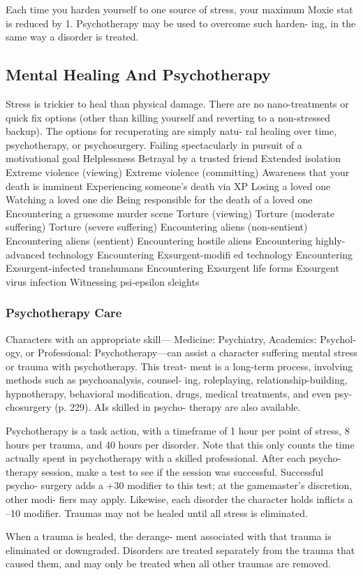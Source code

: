 Each time you harden yourself to one source of 
stress, your maximum Moxie stat is reduced by 1. 
Psychotherapy may be used to overcome such harden-
ing, in the same way a disorder is treated.

\subsection{Mental Healing And Psychotherapy}

Stress is trickier to heal than physical damage. There 
are no nano-treatments or quick fix options (other 
than killing yourself and reverting to a non-stressed 
backup). The options for recuperating are simply natu-
ral healing over time, psychotherapy, or psychosurgery.
Failing spectacularly in pursuit of a motivational goal
Helplessness
Betrayal by a trusted friend
Extended isolation
Extreme violence (viewing)
Extreme violence (committing)
Awareness that your death is imminent
Experiencing someone's death via XP
Losing a loved one
Watching a loved one die
Being responsible for the death of a loved one
Encountering a gruesome murder scene
Torture (viewing)
Torture (moderate suffering)
Torture (severe suffering)
Encountering aliens (non-sentient)
Encountering aliens (sentient)
Encountering hostile aliens
Encountering highly-advanced technology
Encountering Exsurgent-modiﬁ ed technology
Encountering Exsurgent-infected transhumans
Encountering Exsurgent life forms
Exsurgent virus infection
Witnessing psi-epsilon sleights

\subsubsection{Psychotherapy Care}

Characters with an appropriate skill—
Medicine: Psychiatry, Academics: Psychol-
ogy, or Professional: Psychotherapy—can 
assist a character suffering mental stress 
or trauma with psychotherapy. This treat-
ment is a long-term process, involving 
methods such as psychoanalysis, counsel-
ing, roleplaying, relationship-building, 
hypnotherapy, behavioral modification, 
drugs, medical treatments, and even psy-
chosurgery (p. 229). AIs skilled in psycho-
therapy are also available.

Psychotherapy is a task action, with a 
timeframe of 1 hour per point of stress, 
8 hours per trauma, and 40 hours per 
disorder. Note that this only counts the 
time actually spent in psychotherapy with 
a skilled professional. After each psycho-
therapy session, make a test to see if the 
session was successful. Successful psycho-
surgery adds a +30 modifier to this test; at 
the gamemaster's discretion, other modi-
fiers may apply. Likewise, each disorder 
the character holds inflicts a –10 modifier. 
Traumas may not be healed until all stress 
is eliminated.

When a trauma is healed, the derange-
ment associated with that trauma is 
eliminated or downgraded. Disorders are 
treated separately from the trauma that 
caused them, and may only be treated 
when all other traumas are removed.
